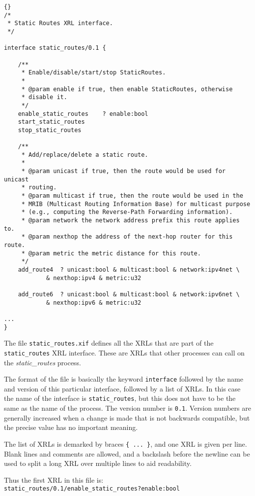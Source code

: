 \documentclass[11pt]{article}
\newcommand{\stt}{\tt\small}
\begin{document}
\begin{lstlisting}[caption={ The start of {\stt xorp/xrl/interfaces/static\_routes.xif} %
                                     \label{lst:xif} } ]{}
/*
 * Static Routes XRL interface.
 */

interface static_routes/0.1 {

	/**
	 * Enable/disable/start/stop StaticRoutes.
	 *
	 * @param enable if true, then enable StaticRoutes, otherwise
	 * disable it.
	 */
	enable_static_routes	? enable:bool
	start_static_routes
	stop_static_routes

	/**
	 * Add/replace/delete a static route.
	 *
	 * @param unicast if true, then the route would be used for unicast
	 * routing.
	 * @param multicast if true, then the route would be used in the
	 * MRIB (Multicast Routing Information Base) for multicast purpose
	 * (e.g., computing the Reverse-Path Forwarding information).
	 * @param network the network address prefix this route applies to.
	 * @param nexthop the address of the next-hop router for this route.
	 * @param metric the metric distance for this route.
	 */
	add_route4	? unicast:bool & multicast:bool & network:ipv4net \
			& nexthop:ipv4 & metric:u32

	add_route6	? unicast:bool & multicast:bool & network:ipv6net \
			& nexthop:ipv6 & metric:u32

...
}
\end{lstlisting}

The file {\stt static\_routes.xif} defines all the XRLs that are part of the
{\stt static\_routes} XRL interface.  These are XRLs that other processes can
call on the {\it static\_routes} process.

The format of the file is basically the keyword {\stt interface}
followed by the name and version of this particular interface,
followed by a list of XRLs.  
In this case the name of the interface is {\stt static\_routes}, but
this does not have to be the same as the name of the process.  The
version number is {\stt 0.1}.  Version numbers are generally increased
when a change is made that is not backwards compatible, but the
precise value has no important meaning.

The list of XRLs is demarked by braces {\stt \{ ... \}}, and one XRL is
given per line.  Blank lines and comments are allowed, and a backslash
before the newline can be used to split a long XRL over multiple lines
to aid readability.

\vspace{0.1in}
\noindent
Thus the first XRL in this file is:\\
 {\tt\small static\_routes/0.1/enable\_static\_routes?enable:bool}
\end{document}
